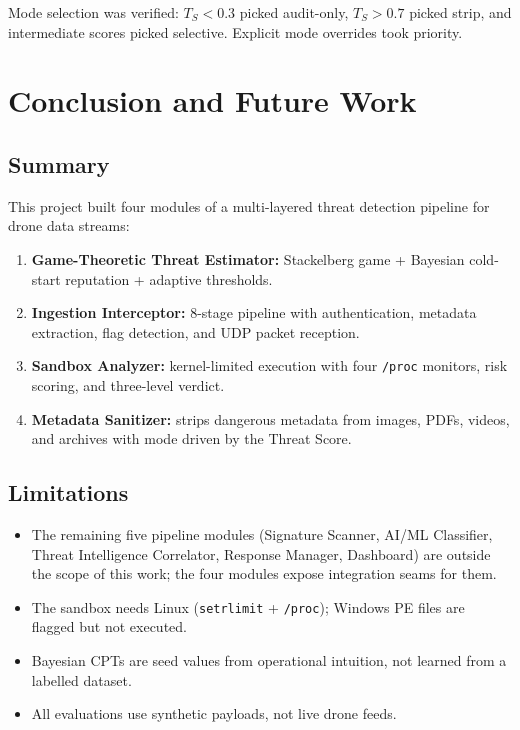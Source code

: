 \documentclass[12pt, a4paper]{report}
\begin{document}
Mode selection was verified: $T_S < 0.3$ picked audit-only, $T_S > 0.7$
picked strip, and intermediate scores picked selective. Explicit mode
overrides took priority.

\cleardoublepage


\chapter{Conclusion and Future Work}
\label{chap:conclusion}

\section{Summary}

This project built four modules of a multi-layered threat detection
pipeline for drone data streams:

\begin{enumerate}
    \item \textbf{Game-Theoretic Threat Estimator:} Stackelberg game
          + Bayesian cold-start reputation + adaptive thresholds.
    \item \textbf{Ingestion Interceptor:} 8-stage pipeline with
          authentication, metadata extraction, flag detection, and
          UDP packet reception.
    \item \textbf{Sandbox Analyzer:} kernel-limited execution with
          four \texttt{/proc} monitors, risk scoring, and three-level
          verdict.
    \item \textbf{Metadata Sanitizer:} strips dangerous metadata
          from images, PDFs, videos, and archives with mode driven by
          the Threat Score.
\end{enumerate}

\section{Limitations}

\begin{itemize}
    \item The remaining five pipeline modules (Signature Scanner, AI/ML
          Classifier, Threat Intelligence Correlator, Response Manager,
          Dashboard) are outside the scope of this work; the four
          modules expose integration seams for them.
    \item The sandbox needs Linux (\texttt{setrlimit} + \texttt{/proc});
          Windows PE files are flagged but not executed.
    \item Bayesian CPTs are seed values from operational intuition, not
          learned from a labelled dataset.
    \item All evaluations use synthetic payloads, not live drone feeds.
\end{itemize}
\end{document}
